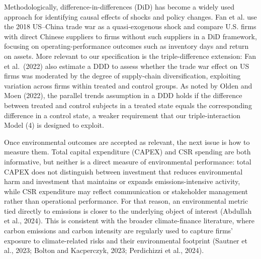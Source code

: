 \documentclass[12pt,a4paper]{article}
\begin{document}
Methodologically, difference-in-differences (DiD) has become a widely used approach for identifying causal effects of shocks and policy changes. Fan et al. use the 2018 US–China trade war as a quasi-exogenous shock and compare U.S. firms with direct Chinese suppliers to firms without such suppliers in a DiD framework, focusing on operating-performance outcomes such as inventory days and return on assets. 
More relevant to our specification is the triple-difference extension: Fan et al.\ (2022) also estimate a DDD to assess whether the trade war effect on US firms was moderated by the degree of supply-chain diversification, exploiting variation across firms within treated and control groups. As noted by Olden and Moen (2022), the parallel trends assumption in a DDD holds if the difference between treated and control subjects in a treated state equals the corresponding difference in a control state, a weaker requirement that our triple-interaction Model (4) is designed to exploit.

Once environmental outcomes are accepted as relevant, the next issue is how to measure them. Total capital expenditure (CAPEX) and CSR spending are both informative, but neither is a direct measure of environmental performance: total CAPEX does not distinguish between investment that reduces environmental harm and investment that maintains or expands emissions-intensive activity, while CSR expenditure may reflect communication or stakeholder management rather than operational performance. For that reason, an environmental metric tied directly to emissions is closer to the underlying object of interest (Abdullah et al., 2024). This is consistent with the broader climate-finance literature, where carbon emissions and carbon intensity are regularly used to capture firms' exposure to climate-related risks and their environmental footprint (Sautner et al., 2023; Bolton and Kacperczyk, 2023; Perdichizzi et al., 2024).
\end{document}

